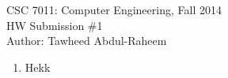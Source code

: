 \documentclass[12pt]{article}
\begin{document}
\begin{center}
  CSC 7011: Computer Engineering, Fall 2014 \\
    HW Submission \#1 \\
    Author: Tawheed Abdul-Raheem
\end{center}

\smallskip

\begin{enumerate}

  \item Hekk
\end{enumerate}
\end{document}
